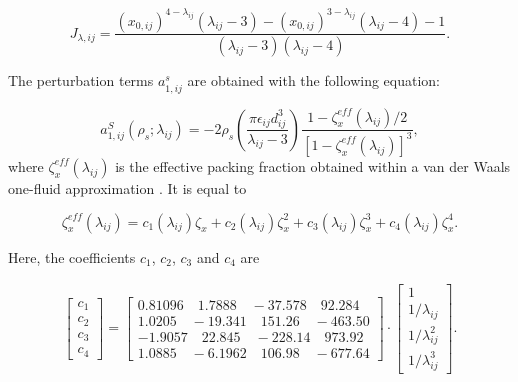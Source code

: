 \begin{equation}
J_{\lambda , ij} = \dfrac{ (x_{0,ij})^{4 - \lambda _{ij}}(\lambda _{ij} -3) - (x_{0,ij})^{3 - \lambda _{ij}}(\lambda _{ij} -4) -1}{(\lambda _{ij} -3)(\lambda _{ij} -4)}.
\end{equation}

The perturbation terms $a_{1,ij}^{s}$ are obtained with the following equation:

\begin{equation}
a_{1,ij}^{S} (\rho _{s} ; \lambda _{ij}) = -2 \rho _{s} \left(\dfrac{\pi \epsilon _{ij} d_{ij}^{3}}{\lambda _{ij} -3}\right) \dfrac{1 - \zeta _{x}^{eff}(\lambda _{ij})/2}{[1- \zeta _{x}^{eff}(\lambda _{ij})]^3},
\end{equation}
where $\zeta _{x}^{eff}(\lambda _{ij})$ is the effective packing fraction  obtained within a van der Waals one-fluid approximation \cite{lafitte2013}. It is equal to

\begin{equation}
\zeta _{x}^{eff}(\lambda _{ij}) = c_{1}(\lambda_{ij}) \zeta_{x} + c_{2}(\lambda_{ij}) \zeta_{x}^{2} + c_{3}(\lambda_{ij}) \zeta_{x}^3 + c_{4}(\lambda_{ij}) \zeta_{x}^4 . 
\end{equation}

Here, the coefficients $c_{1}$, $c_{2}$, $c_{3}$ and $c_{4}$ are 

\begin{equation}
\begin{aligned}
\left[ \begin{array}{c} c_{1} \\ c_{2} \\ c_{3} \\ c_{4} \end{array} \right] = 
\left[ \begin{array}{c} 0.81096 \quad 1.7888 \quad -37.578 \quad 92.284 \\ 1.0205 \quad -19.341 \quad 151.26 \quad -463.50 \\ -1.9057 \quad 22.845 \quad -228.14 \quad 973.92 \\ 1.0885 \quad  -6.1962 \quad 106.98 \quad -677.64 \end{array} \right] \cdot \left[ \begin{array}{c} 1 \\ 1/\lambda_{ij} \\ 1/\lambda_{ij}^{2} \\ 1/\lambda_{ij}^{3} \end{array} \right].
\end{aligned}
\end{equation}

